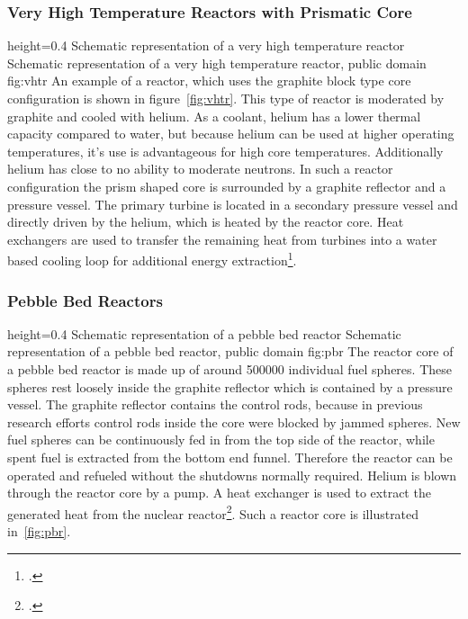 \subsubsection{Very High Temperature Reactors with Prismatic Core}
    {height=0.4\textheight}
    {Schematic representation of a very high temperature reactor}
    {Schematic representation of a very high temperature reactor, public domain}
    {fig:vhtr}
An example of a reactor, which uses the graphite block type core configuration is shown in figure~\ref{fig:vhtr}.
This type of reactor is moderated by graphite and cooled with helium. As a coolant, helium has
a lower thermal capacity compared to water, but because helium can be used at higher operating
temperatures, it's use is advantageous for high core temperatures. Additionally helium has close
to no ability to moderate neutrons. In such a reactor configuration
the prism shaped core is surrounded by a graphite reflector and a pressure vessel. The primary turbine
is located in a secondary pressure vessel and directly driven by the helium, which is heated by the
reactor core. Heat exchangers are used to transfer the remaining heat from turbines into a water based
cooling loop for additional energy extraction\footcite{VHTRTS}.
\subsubsection{Pebble Bed Reactors}\label{chap:pbr}
    {height=0.4\textheight}
    {Schematic representation of a pebble bed reactor}
    {Schematic representation of a pebble bed reactor, public domain}
    {fig:pbr}
The reactor core of a pebble bed reactor is made up of around 500000 individual fuel spheres. These
spheres rest loosely inside the graphite reflector which is contained by a pressure vessel. The graphite
reflector contains the control rods, because in previous research efforts control rods inside the core were blocked
by jammed spheres. New fuel spheres can be continuously fed in from the top side of the reactor, while
spent fuel is extracted from the bottom end funnel. Therefore the reactor can be operated and refueled
without the shutdowns normally required. Helium is blown through the reactor core by a
pump. A heat exchanger is used to extract the generated heat from the nuclear reactor\footcite[60-62]{T4Gen}.
Such a reactor core is illustrated in~\ref{fig:pbr}.
